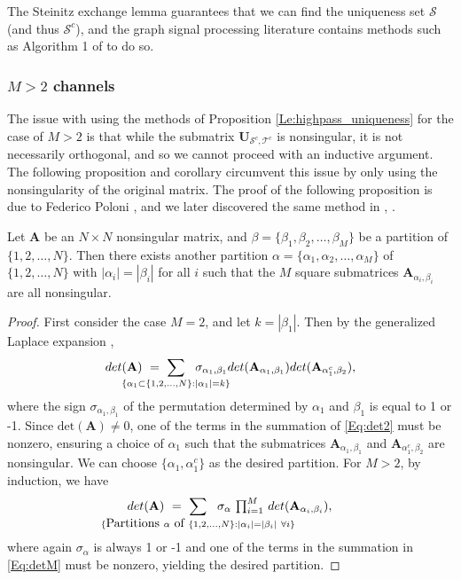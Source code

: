 \documentclass[journal, 10pt]{IEEEtran}
\begin{document}
The Steinitz exchange lemma \cite{steinitz} guarantees that we can find the uniqueness set $\mathcal{S}$ (and thus $\mathcal{S}^c$), and the graph signal processing literature contains methods such as Algorithm 1 of \cite{shomorony} to do so.

\subsubsection{$M>2$ channels}
The issue with using the methods of Proposition \ref{Le:highpass_uniqueness} for the case of $M>2$ is that while the submatrix ${\mathbf{U}}_{{\mathcal S^c},{\mathcal T^c}}$ is nonsingular, it is not necessarily orthogonal, and so we cannot proceed with an inductive argument. The following proposition and corollary circumvent this issue by only using the nonsingularity of the original matrix. The proof of the following proposition is due to Federico Poloni \cite{poloni}, %
and we later discovered the same method in \cite{greeneMultiple}, \cite[Theorem 3.3]{greene_magnanti}.
\begin{proposition}\label{Pr:mat_part}
Let $\mathbf{A}$ be an $N \times N$ nonsingular matrix, and $\beta=\{\beta_1,\beta_2,\ldots,\beta_M\}$ be a partition of $\{1,2,\ldots,N\}$. Then there exists another partition $\alpha=\{\alpha_1,\alpha_2,\ldots,\alpha_M\}$ of $\{1,2,\ldots,N\}$ with $|\alpha_i|=|\beta_i|$ for all $i$ such that the $M$ square submatrices $\mathbf{A}_{\alpha_i,\beta_i}$ are all nonsingular.
\end{proposition}
\begin{proof}%
First consider the case $M=2$, and let $k=|\beta_1|$. Then by the generalized Laplace expansion \cite{gle}, 
\begin{align}\label{Eq:det2}
\mbox{det}(\mathbf{A})~=~\sum_{\mathclap{\{\alpha_1 \subset \{1,2,\ldots,N\}: |\alpha_1|=k \}}}~~\sigma_{\alpha_1,\beta_1} \mbox{det}(\mathbf{A}_{\alpha_1,\beta_1})\mbox{det}(\mathbf{A}_{\alpha_1^c,\beta_2}),
\end{align}
where the sign $\sigma_{\alpha_1,\beta_1}$ of the permutation determined by $\alpha_1$ and $\beta_1$ is equal to 1 or -1. Since $\mbox{det}(\mathbf{A})\neq 0$, one of the terms in the summation of \eqref{Eq:det2} must be nonzero, ensuring a choice of $\alpha_1$ such that the submatrices $\mathbf{A}_{\alpha_1,\beta_1}$ and $\mathbf{A}_{\alpha_1^c,\beta_2}$ are nonsingular. We can choose $\{\alpha_1,\alpha_1^c\}$ as the desired partition. For $M>2$, by induction, we have
\begin{align}\label{Eq:detM}
\mbox{det}(\mathbf{A})~=~\sum_{\mathclap{\{\hbox{Partitions } \alpha \hbox{ of }\{1,2,\ldots,N\}: |\alpha_i|=|\beta_i|~\forall i \}}}~~\sigma_{\alpha}~{\textstyle \prod_{i=1}^M}~\mbox{det}(\mathbf{A}_{\alpha_i,\beta_i}),
\end{align}
where again $\sigma_\alpha$ is always 1 or -1 and one of the terms in the summation in \eqref{Eq:detM} must be nonzero, yielding the desired partition. 
\end{proof}
\end{document}

